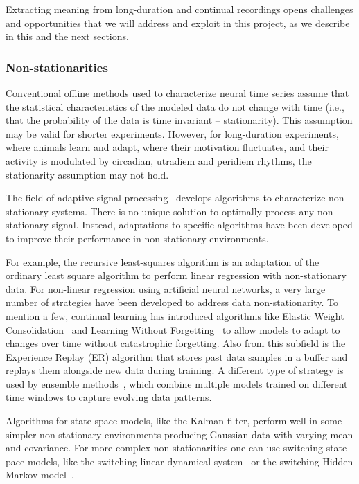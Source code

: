 \documentclass[12pt]{article}
\begin{document}
Extracting meaning from long-duration and continual recordings opens
challenges and opportunities that we will address and exploit in this project,
as we describe in this and the next sections.

\subsubsection*{Non-stationarities}

Conventional offline methods used to characterize neural time series assume
that the statistical characteristics of the modeled data do not change with
time (i.e., that the probability of the data is time invariant --
stationarity). This assumption may be valid for shorter experiments. However,
for long-duration experiments, where animals learn and adapt, where their
motivation fluctuates, and their activity is modulated by circadian, utradiem
and peridiem rhythms, the stationarity assumption may not hold.

The field of adaptive signal processing~\citep{haykin02} develops algorithms to
characterize non-stationary systems. There is no unique solution to optimally
process any non-stationary signal. Instead, adaptations to specific algorithms
have been developed to improve their performance in non-stationary
environments.

For example, the recursive least-squares algorithm \citep[][Chapter
9]{haykin02} is an adaptation of the ordinary least square algorithm to perform
linear regression with non-stationary data.
%
For non-linear regression using artificial neural networks, a very large number
of strategies have been developed to address data non-stationarity. To mention
a few, continual learning has introduced algorithms like  Elastic Weight
Consolidation~\citep[EWC][]{} and Learning Without Forgetting~\citep[LwF][]{}
to allow models to adapt to changes over time without catastrophic forgetting.
Also from this subfield is the Experience Replay (ER) algorithm that stores
past data samples in a buffer and replays them alongside new data during
training. A different type of strategy is used by ensemble methods~\citep{},
which combine multiple models trained on different time windows to capture
evolving data patterns.

Algorithms for state-space models, like the Kalman filter, perform well in some
simpler non-stationary environments producing Gaussian data with varying mean and
covariance.
%
For more complex non-stationarities one can use switching state-pace models,
like the switching linear dynamical system~\cite{} or the switching Hidden
Markov model~\cite{}.
\end{document}
